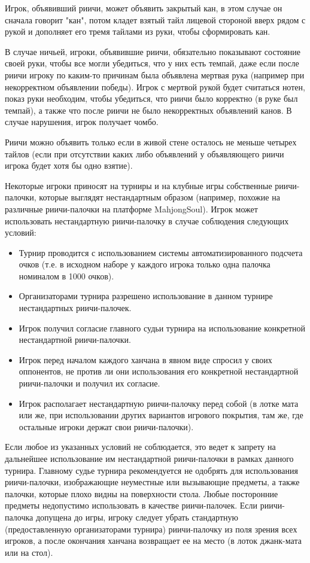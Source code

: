 Игрок, объявивший риичи, может объявить закрытый кан, в этом случае он сначала говорит "кан", потом кладет взятый тайл лицевой стороной вверх рядом с рукой и дополняет его тремя тайлами из руки, чтобы сформировать кан.

В случае ничьей, игроки, объявившие риичи, обязательно показывают состояние своей руки, чтобы все могли убедиться, что у них есть темпай, даже если после риичи игроку по каким-то причинам была объявлена мертвая рука (например при некорректном объявлении победы). Игрок с мертвой рукой будет считаться нотен, показ руки необходим, чтобы убедиться, что риичи было корректно (в руке был темпай), а также что после риичи не было некорректных объявлений канов. В случае нарушения, игрок получает чомбо.

Риичи можно объявить только если в живой стене осталось не меньше четырех тайлов (если при отсутствии каких либо объявлений у объявляющего риичи игрока будет хотя бы одно взятие). 

\newpage

Некоторые игроки приносят на турниры и на клубные игры собственные риичи-палочки, которые выглядят нестандартным образом (например, похожие на различные риичи-палочки на платформе MahjongSoul). Игрок может использовать нестандартную риичи-палочку в случае соблюдения следующих условий:

\begin{itemize}
	\item Турнир проводится с использованием системы автоматизированного подсчета очков (т.е. в исходном наборе у каждого игрока только одна палочка номиналом в 1000 очков).
	\item Организаторами турнира разрешено использование в данном турнире нестандартных риичи-палочек.
	\item Игрок получил согласие главного судьи турнира на использование конкретной нестандартной риичи-палочки.
	\item Игрок перед началом каждого ханчана в явном виде спросил у своих оппонентов, не против ли они использования его конкретной нестандартной риичи-палочки и получил их согласие.
	\item Игрок располагает нестандартную риичи-палочку перед собой (в лотке мата или же, при использовании других вариантов игрового покрытия, там же, где остальные игроки держат свои риичи-палочки).
\end{itemize}

Если любое из указанных условий не соблюдается, это ведет к запрету на дальнейшее использование им нестандартной риичи-палочки в рамках данного турнира. Главному судье турнира рекомендуется не одобрять для использования риичи-палочки, изображающие неуместные или вызывающие предметы, а также палочки, которые плохо видны на поверхности стола. Любые посторонние предметы недопустимо использовать в качестве риичи-палочек. Если риичи-палочка допущена до игры, игроку следует убрать стандартную (предоставленную организаторами турнира) риичи-палочку из поля зрения всех игроков, а после окончания ханчана возвращает ее на место (в лоток джанк-мата или на стол).

